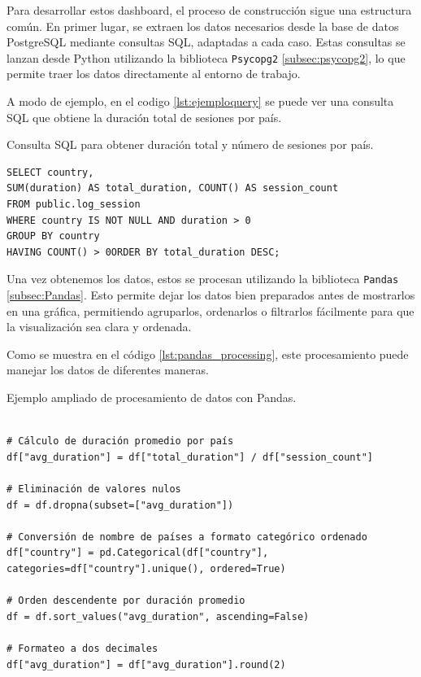 \documentclass[a4paper, 12pt]{book}
\begin{document}
Para desarrollar estos dashboard, el proceso de construcción sigue una estructura común. En primer lugar, se extraen los datos necesarios desde la base de datos PostgreSQL mediante consultas SQL, adaptadas a cada caso. Estas consultas se lanzan desde Python utilizando la biblioteca \texttt{Psycopg2} \ref{subsec:psycopg2}, lo que permite traer los datos directamente al entorno de trabajo.

A modo de ejemplo, en el codigo \ref{lst:ejemploquery} se puede ver una consulta SQL que obtiene la duración total de sesiones por país.

\begin{listing}[h!]
\caption{Consulta SQL para obtener duración total y número de sesiones por país.}{}
\label{lst:ejemploquery}
\begin{verbatim}
SELECT country,
SUM(duration) AS total_duration, COUNT() AS session_count
FROM public.log_session
WHERE country IS NOT NULL AND duration > 0
GROUP BY country
HAVING COUNT() > 0ORDER BY total_duration DESC;
\end{verbatim}
\end{listing}

Una vez obtenemos los datos, estos se procesan utilizando la biblioteca \texttt{Pandas} \ref{subsec:Pandas}. Esto permite dejar los datos bien preparados antes de mostrarlos en una gráfica, permitiendo agruparlos, ordenarlos o filtrarlos fácilmente para que la visualización sea clara y ordenada.

Como se muestra en el código \ref{lst:pandas_processing}, este procesamiento puede manejar los datos de diferentes maneras.

\begin{listing}[h!]
    \caption{Ejemplo ampliado de procesamiento de datos con Pandas.}
    \label{lst:pandas_processing}
    \begin{verbatim}
    
# Cálculo de duración promedio por país
df["avg_duration"] = df["total_duration"] / df["session_count"]

# Eliminación de valores nulos
df = df.dropna(subset=["avg_duration"])

# Conversión de nombre de países a formato categórico ordenado
df["country"] = pd.Categorical(df["country"], categories=df["country"].unique(), ordered=True)

# Orden descendente por duración promedio
df = df.sort_values("avg_duration", ascending=False)

# Formateo a dos decimales 
df["avg_duration"] = df["avg_duration"].round(2)

    \end{verbatim}
\end{listing}
\end{document}
